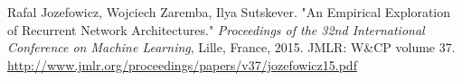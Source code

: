 \documentclass[10pt]{amsart}
\begin{document}
\begin{thebibliography}{9}
Rafal Jozefowicz, Wojciech Zaremba, Ilya Sutskever.  "An Empirical Exploration of Recurrent Network Architectures."  \emph{Proceedings of the 32nd
International  Conference on  Machine Learning}, Lille, France, 2015.  JMLR: W\&CP volume 37.  \url{http://www.jmlr.org/proceedings/papers/v37/jozefowicz15.pdf} 


  
\end{thebibliography}
\end{document}

